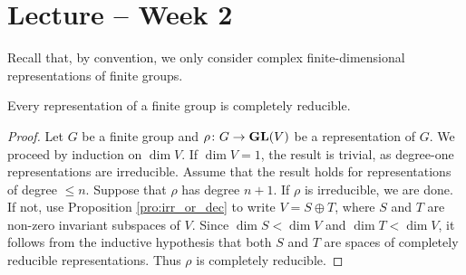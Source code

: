 \section{Lecture -- Week 2}
\label{7}

Recall that, by convention, we only consider complex 
finite-dimensional representations of finite groups.

\begin{theorem}[Maschke]
    Every representation of a finite group is completely reducible.
\end{theorem}

\begin{proof}
    Let $G$ be a finite group and $\rho\colon G\to\mathbf{GL}(V)$ be a representation of $G$. We proceed
    by induction on $\dim V$.
    If $\dim V=1$, the result is trivial, as degree-one representations are irreducible. Assume that
    the result holds for representations of degree $\leq n$. Suppose that $\rho$ has degree $n+1$. 
    If $\rho$ is irreducible, we are done. If not, use 
    Proposition \ref{pro:irr_or_dec} to 
    write $V=S\oplus T$, where $S$ and $T$
    are non-zero invariant subspaces of $V$. Since $\dim S<\dim V$ and $\dim T<\dim V$, it follows from
    the inductive hypothesis that
    both $S$ and $T$ are spaces of completely reducible representations. 
    Thus $\rho$ is completely reducible.
\end{proof}


